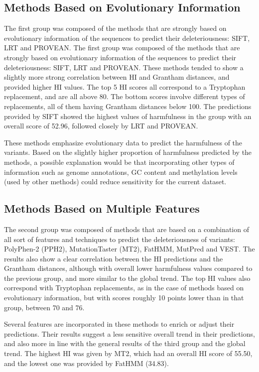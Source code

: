\documentclass[12pt,MSc,wordcount,anon]{muthesis}
\begin{document}
\begin{flushleft}
\subsection{Methods Based on Evolutionary Information}

The first group was composed of the methods that are strongly based on evolutionary information of the sequences to predict their deleteriousness: SIFT, LRT and PROVEAN. The first group was composed of the methods that are strongly based on evolutionary information of the sequences to predict their deleteriousness: SIFT, LRT and PROVEAN. These methods tended to show a slightly more strong correlation between HI and Grantham distances, and provided higher HI values. The top 5 HI scores all correspond to a Tryptophan replacement, and are all above 80. The bottom scores involve different types of replacements, all of them having Grantham distances below 100. The predictions provided by SIFT showed the highest values of harmfulness in the group with an overall score of 52.96, followed closely by LRT and PROVEAN.

These methods emphasize evolutionary data to predict the harmfulness of the variants. Based on the slightly higher proportion of harmfulness predicted by the methods, a possible explanation would be that incorporating other types of information such as genome annotations, GC content and methylation levels (used by other methods) could reduce sensitivity for the current dataset.

\subsection{Methods Based on Multiple Features}

The second group was composed of methods that are based on a combination of all sort of features and techniques to predict the deleteriousness of variants: PolyPhen-2 (PPH2), MutationTaster (MT2), FatHMM, MutPred and VEST. The results also show a clear correlation between the HI predictions and the Grantham distances, although with overall lower harmfulness values compared to the previous group, and more similar to the global trend. The top HI values also correspond with Tryptophan replacements, as in the case of methods based on evolutionary information, but with scores roughly 10 points lower than in that group, between 70 and 76.

Several features are incorporated in these methods to enrich or adjust their predictions. Their results suggest a less sensitive overall trend in their predictions, and also more in line with the general results of the third group and the global trend. The highest HI was given by MT2, which had an overall HI score of 55.50, and the lowest one was provided by FatHMM (34.83).


\end{flushleft}
\end{document}
